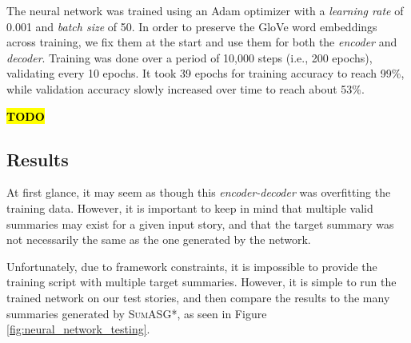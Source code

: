 The neural network was trained using an Adam optimizer with a \textit{learning rate} of 0.001 and \textit{batch size} of 50. In order to preserve the GloVe word embeddings across training, we fix them at the start and use them for both the \textit{encoder} and \textit{decoder}. Training was done over a period of 10,000 steps (i.e., 200 epochs), validating every 10 epochs. It took 39 epochs for training accuracy to reach 99\%, while validation accuracy slowly increased over time to reach about 53\%.

\textcolor{red}{\textbf{\hl{TODO}}}

\subsection{Results}

At first glance, it may seem as though this \textit{encoder-decoder} was overfitting the training data. However, it is important to keep in mind that multiple valid summaries may exist for a given input story, and that the target summary was not necessarily the same as the one generated by the network.

Unfortunately, due to framework constraints, it is impossible to provide the training script with multiple target summaries. However, it is simple to run the trained network on our test stories, and then compare the results to the many summaries generated by \textsc{SumASG*}, as seen in Figure \ref{fig:neural_network_testing}.

